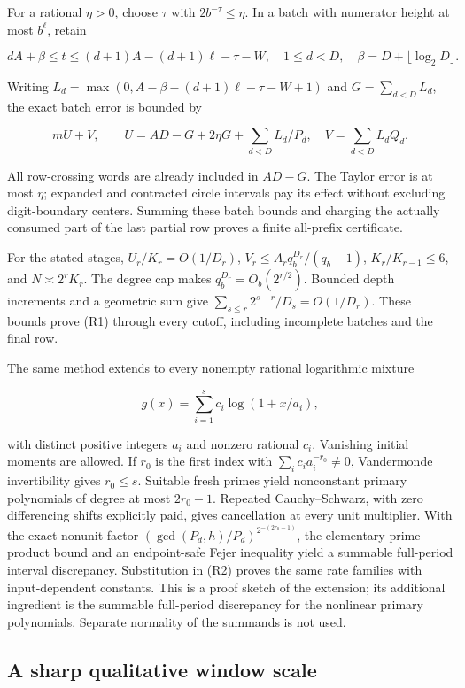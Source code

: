 \documentclass[11pt,a4paper]{article}
\begin{document}
For a rational \(\eta>0\), choose \(\tau\) with \(2b^{-\tau}\le\eta\).
In a batch with numerator height at most \(b^\ell\), retain

\[
dA+\beta\le t\le(d+1)A-(d+1)\ell-\tau-W,
\quad 1\le d< D,\quad \beta=D+\lfloor\log_2D\rfloor.
\]

Writing \(L_d=\max(0,A-\beta-(d+1)\ell-\tau-W+1)\) and
\(G=\sum_{d< D}L_d\), the exact batch error is bounded by

\[
mU+V,\qquad
U=AD-G+2\eta G+\sum_{d< D}L_d/P_d,
\quad V=\sum_{d< D}L_dQ_d.
\tag{R2}
\]

All row-crossing words are already included in \(AD-G\). The Taylor
error is at most \(\eta\); expanded and contracted circle intervals pay
its effect without excluding digit-boundary centers. Summing these batch
bounds and charging the actually consumed part of the last partial row
proves a finite all-prefix certificate.

For the stated stages, \(U_r/K_r=O(1/D_r)\),
\(V_r\le A_rq_b^{D_r}/(q_b-1)\), \(K_r/K_{r-1}\le6\), and
\(N\asymp2^rK_r\). The degree cap makes \(q_b^{D_r}=O_b(2^{r/2})\).
Bounded depth increments and a geometric sum give
\(\sum_{s\le r}2^{s-r}/D_s=O(1/D_r)\). These bounds prove (R1) through
every cutoff, including incomplete batches and the final row.

The same method extends to every nonempty rational logarithmic mixture

\[
g(x)=\sum_{i=1}^s c_i\log(1+x/a_i),
\]

with distinct positive integers \(a_i\) and nonzero rational \(c_i\).
Vanishing initial moments are allowed. If \(r_0\) is the first index
with \(\sum_i c_i a_i^{-r_0}\ne0\), Vandermonde invertibility gives
\(r_0\le s\). Suitable fresh primes yield nonconstant primary
polynomials of degree at most \(2r_0-1\). Repeated Cauchy--Schwarz, with
zero differencing shifts explicitly paid, gives cancellation at every
unit multiplier. With the exact nonunit factor
\((\gcd(P_d,h)/P_d)^{2^{-(2r_0-1)}}\), the elementary prime-product
bound and an endpoint-safe Fejer inequality yield a summable full-period
interval discrepancy. Substitution in (R2) proves the same rate families
with input-dependent constants. This is a proof sketch of the extension;
its additional ingredient is the summable full-period discrepancy for
the nonlinear primary polynomials. Separate normality of the summands is
not used.

\subsection{A sharp qualitative window
scale}\label{a-sharp-qualitative-window-scale}
\end{document}
